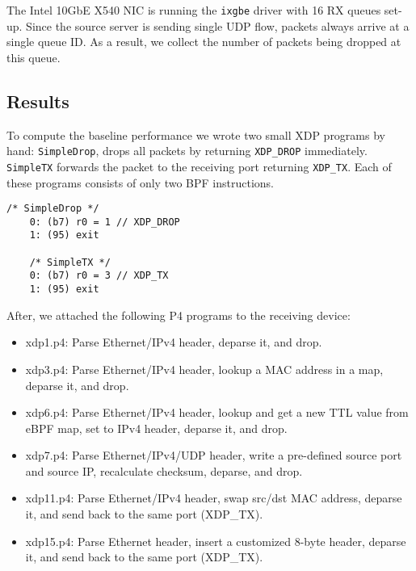 The Intel 10GbE X540 NIC is running the \texttt{ixgbe} driver with 16 RX queues
set-up. Since the source server is sending single UDP flow, packets
always arrive at a single queue ID.  As a result, we collect the number
of packets being dropped at this queue.

\subsection{Results}

To compute the baseline performance we wrote two small XDP programs by
hand: \texttt{SimpleDrop}, drops all packets by returning
\texttt{XDP\_DROP} immediately.  \texttt{SimpleTX} forwards the packet
to the receiving port returning \texttt{XDP\_TX}.  Each of these
programs consists of only two BPF instructions.

\begin{lstlisting}[frame=none]
    /* SimpleDrop */
    0: (b7) r0 = 1 // XDP_DROP
    1: (95) exit

    /* SimpleTX */
    0: (b7) r0 = 3 // XDP_TX
    1: (95) exit
\end{lstlisting}

After, we attached the following P4 programs to the receiving device:
\begin{itemize}
\item xdp1.p4: Parse Ethernet/IPv4 header, deparse it, and drop.
\item xdp3.p4: Parse Ethernet/IPv4 header, lookup a MAC address
in a map, deparse it, and drop.
\item xdp6.p4: Parse Ethernet/IPv4 header, lookup and get a new TTL value
from eBPF map, set to IPv4 header, deparse it, and drop.
\item xdp7.p4: Parse Ethernet/IPv4/UDP header, write a pre-defined source port
and source IP, recalculate checksum, deparse, and drop.
\item xdp11.p4: Parse Ethernet/IPv4 header, swap src/dst MAC address,
deparse it, and send back to the same port (XDP\_TX).
\item xdp15.p4: Parse Ethernet header, insert a customized 8-byte header,
deparse it, and send back to the same port (XDP\_TX).
\end{itemize}

